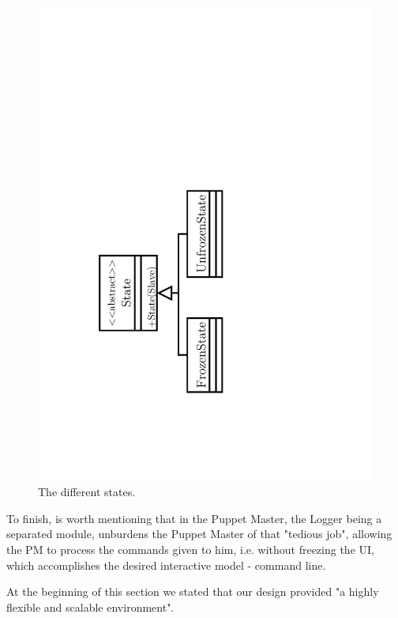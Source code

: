 \documentclass[times, 10pt,twocolumn]{article}
\begin{document}
\begin{figure}[h]
	\centering
	\includegraphics[angle=270, scale=0.45, trim=3.7cm 2.8cm 9cm 0cm]{"Architecture/State"}
	\caption{The different states.} 
	\label{fig:state}
\end{figure}


To finish, is worth mentioning that in the Puppet Master, the Logger being a separated module, unburdens the Puppet Master of that "tedious job", allowing the PM to process the commands given to him, i.e. without freezing the UI, which accomplishes the desired interactive model - command line.


At the beginning of this section we stated that our design provided "a highly flexible and scalable environment".
\end{document}

